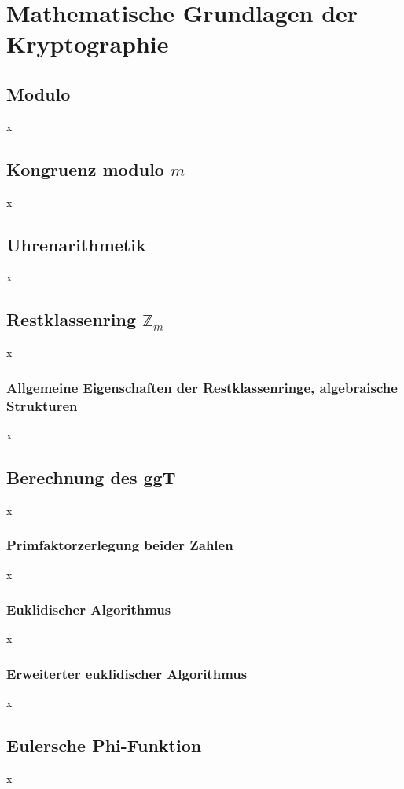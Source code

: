 \chapter{Mathematische Grundlagen der Kryptographie}
\section{Modulo}
x

\section{Kongruenz modulo $m$}
x

\section{Uhrenarithmetik}
x

\section{Restklassenring $\mathbb{Z}_m$}
x

\subsection{Allgemeine Eigenschaften der Restklassenringe, algebraische Strukturen}
x

\section{Berechnung des ggT}
x

\subsection{Primfaktorzerlegung beider Zahlen}
x

\subsection{Euklidischer Algorithmus}
x

\subsection{Erweiterter euklidischer Algorithmus}
x

\section{Eulersche Phi-Funktion}
x

